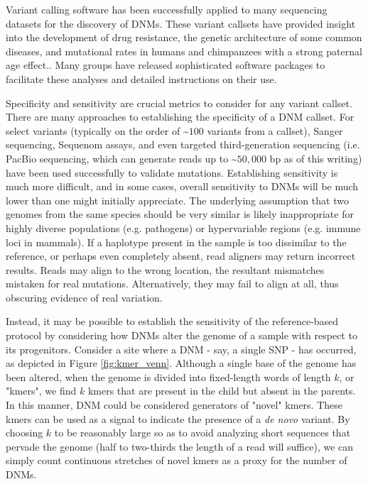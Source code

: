 Variant calling software has been successfully applied to many sequencing datasets for the discovery of DNMs.  These variant callsets have provided insight into the development of drug resistance\cite{Woodford:2007it}, the genetic architecture of some common diseases\cite{Neale:2012ki}, and mutational rates in humans and chimpanzees with a strong paternal age effect.\cite{Conrad:2011eh,Venn:2014ep,Kloosterman:2015cn,Francioli:2015kj}.  Many groups have released sophisticated software packages to facilitate these analyses and detailed instructions on their use\cite{DePristo:2011fo,Rimmer:2014ho}.

Specificity and sensitivity are crucial metrics to consider for any variant callset.  There are many approaches to establishing the specificity of a DNM callset.  For select variants (typically on the order of \textasciitilde $100$ variants from a callset), Sanger sequencing, Sequenom assays, and even targeted third-generation sequencing (i.e. PacBio sequencing, which can generate reads up to \textasciitilde $50,000$ bp as of this writing) have been used successfully to validate mutations.  Establishing sensitivity is much more difficult, and in some cases, overall sensitivity to DNMs will be much lower than one might initially appreciate.  The underlying assumption that two genomes from the same species should be very similar is likely inappropriate for highly diverse populations (e.g. pathogens) or hypervariable regions (e.g. immune loci in mammals).  If a haplotype present in the sample is too dissimilar to the reference, or perhaps even completely absent, read aligners may return incorrect results.  Reads may align to the wrong location, the resultant mismatches mistaken for real mutations.  Alternatively, they may fail to align at all, thus obscuring evidence of real variation.

Instead, it may be possible to establish the sensitivity of the reference-based protocol by considering how DNMs alter the genome of a sample with respect to its progenitors.  Consider a site where a DNM - say, a single SNP - has occurred, as depicted in Figure \ref{fig:kmer_venn}.  Although a single base of the genome has been altered, when the genome is divided into fixed-length words of length $k$, or "kmers", we find $k$ kmers that are present in the child but absent in the parents.  In this manner, DNM could be considered generators of "novel" kmers.  These kmers can be used as a signal to indicate the presence of a \textit{de novo} variant.  By choosing $k$ to be reasonably large so as to avoid analyzing short sequences that pervade the genome (half to two-thirds the length of a read will suffice), we can simply count continuous stretches of novel kmers as a proxy for the number of DNMs.

